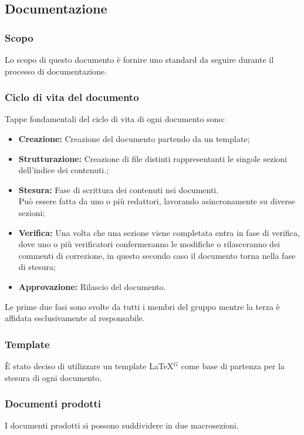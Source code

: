 \subsection{Documentazione}

\subsubsection{Scopo}
Lo scopo di questo documento è fornire uno standard da seguire durante il processo di documentazione.

\subsubsection{Ciclo di vita del documento}
Tappe fondamentali del ciclo di vita di ogni documento sono:
  \begin{itemize}
    \item \textbf{Creazione:} Creazione del documento partendo da un template;
    \item \textbf{Strutturazione:} Creazione di file distinti rappresentanti le singole sezioni dell'indice dei contenuti.;
    \item \textbf{Stesura:} Fase di scrittura dei contenuti nei documenti.\\
     Può essere fatta da uno o più redattori, lavorando asincronamente su diverse sezioni;
    \item \textbf{Verifica:} Una volta che una sezione viene completata entra in fase di verifica, dove uno o più verificatori
      confermeranno le modifiche o rilasceranno dei commenti di correzione, in questo secondo caso il documento torna
      nella fase di stesura;
    \item \textbf{Approvazione:} Rilascio del documento.
  \end{itemize}
  Le prime due fasi sono svolte da tutti i membri del gruppo mentre la terza è affidata esclusivamente al responsabile.

\subsubsection{Template}
È stato deciso di utilizzare un template \LaTeX$^{G}$ come base di partenza per la stesura di ogni documento.

\subsubsection{Documenti prodotti}
I documenti prodotti si possono suddividere in due macrosezioni.

